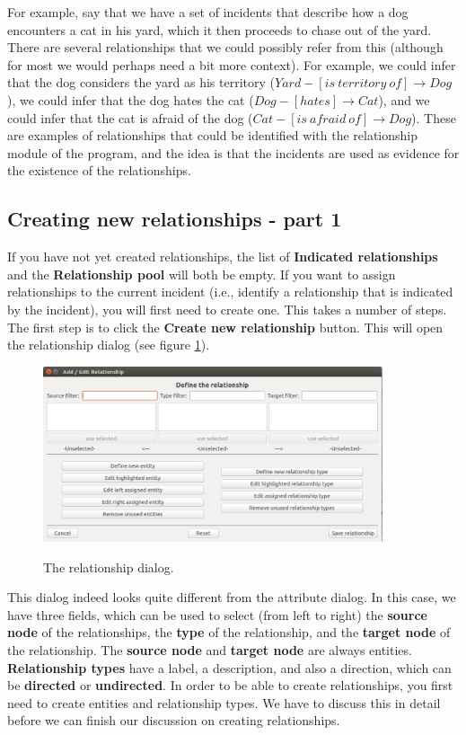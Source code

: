 \documentclass{memoir}
\begin{document}
For example, say that we have a set of incidents that describe how a dog encounters a cat in his yard, which it then proceeds to chase out of the yard. There are several relationships that we could possibly refer from this (although for most we would perhaps need a bit more context). For example, we could infer that the dog considers the yard as his territory (\(Yard-[is\  territory\ of]\rightarrow Dog\)), we could infer that the dog hates the cat (\(Dog-[hates]\rightarrow Cat\)), and we could infer that the cat is afraid of the dog (\(Cat-[is\ afraid\ of]\rightarrow Dog\)). These are examples of relationships that could be identified with the relationship module of the program, and the idea is that the incidents are used as evidence for the existence of the relationships.

\subsection{Creating new relationships - part 1}
\label{sec:creatingnewrelationships1}

If you have not yet created relationships, the list of \textbf{Indicated relationships} and the \textbf{Relationship pool} will both be empty. If you want to assign relationships to the current incident (i.e., identify a relationship that is indicated by the incident), you will first need to create one. This takes a number of steps. The first step is to click the \textbf{Create new relationship} button. This will open the relationship dialog (see figure \ref{fig:relationshipdialog}).

\begin{figure}[h!]
  \centering
  \caption{The relationship dialog.}
  \includegraphics[width=100mm]{Screenshot_15.pdf}
  \label{fig:relationshipdialog}
\end{figure}

This dialog indeed looks quite different from the attribute dialog. In this case, we have three fields, which can be used to select (from left to right) the \textbf{source node} of the relationships, the \textbf{type} of the relationship, and the \textbf{target node} of the relationship. The \textbf{source node} and \textbf{target node} are always entities. \textbf{Relationship types} have a label, a description, and also a direction, which can be \textbf{directed} or \textbf{undirected}. In order to be able to create relationships, you first need to create entities and relationship types. We have to discuss this in detail before we can finish our discussion on creating relationships.
\end{document}
